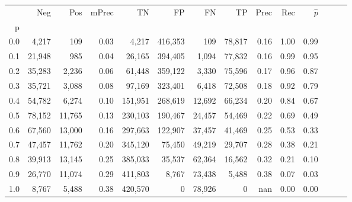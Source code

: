 \begin{tabular}{rrrrrrrrrrrrrr}
\toprule
{} &     Neg &     Pos & mPrec &       TN &       FP &      FN &      TP &  Prec &   Rec & $\hat{p}$ \\
p   &         &         &       &          &          &         &         &       &       &           \\
\midrule
0.0 &   4,217 &     109 &  0.03 &    4,217 &  416,353 &     109 &  78,817 &  0.16 &  1.00 &      0.99 \\
0.1 &  21,948 &     985 &  0.04 &   26,165 &  394,405 &   1,094 &  77,832 &  0.16 &  0.99 &      0.95 \\
0.2 &  35,283 &   2,236 &  0.06 &   61,448 &  359,122 &   3,330 &  75,596 &  0.17 &  0.96 &      0.87 \\
0.3 &  35,721 &   3,088 &  0.08 &   97,169 &  323,401 &   6,418 &  72,508 &  0.18 &  0.92 &      0.79 \\
0.4 &  54,782 &   6,274 &  0.10 &  151,951 &  268,619 &  12,692 &  66,234 &  0.20 &  0.84 &      0.67 \\
0.5 &  78,152 &  11,765 &  0.13 &  230,103 &  190,467 &  24,457 &  54,469 &  0.22 &  0.69 &      0.49 \\
0.6 &  67,560 &  13,000 &  0.16 &  297,663 &  122,907 &  37,457 &  41,469 &  0.25 &  0.53 &      0.33 \\
0.7 &  47,457 &  11,762 &  0.20 &  345,120 &   75,450 &  49,219 &  29,707 &  0.28 &  0.38 &      0.21 \\
0.8 &  39,913 &  13,145 &  0.25 &  385,033 &   35,537 &  62,364 &  16,562 &  0.32 &  0.21 &      0.10 \\
0.9 &  26,770 &  11,074 &  0.29 &  411,803 &    8,767 &  73,438 &   5,488 &  0.38 &  0.07 &      0.03 \\
1.0 &   8,767 &   5,488 &  0.38 &  420,570 &        0 &  78,926 &       0 &   nan &  0.00 &      0.00 \\
\bottomrule
\end{tabular}

